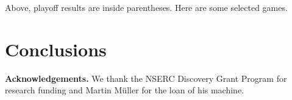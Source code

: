 \documentclass{icga}
\def\Eo{\mbox{\sc Ezo}}
\def\Mx{\mbox{\sc MoHex}}
\begin{document}
Above, playoff results are inside parentheses.
Here are some selected games.

\section{Conclusions}


{\bf Acknowledgements.}
We thank the NSERC Discovery Grant Program for research funding and
Martin M\"{u}ller for the loan of his machine.

\end{document}
